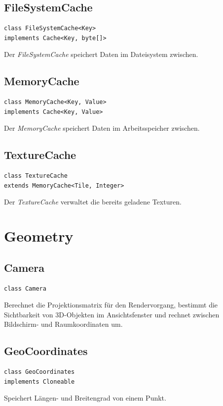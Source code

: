 \documentclass[10pt]{scrreprt}
\begin{document}
\vspace{5mm}
\subsection*{FileSystemCache}
\begin{lstlisting}
class FileSystemCache<Key>
implements Cache<Key, byte[]>
\end{lstlisting}
Der \textit{FileSystemCache} speichert Daten im Dateisystem zwischen.\\

\vspace{5mm}
\subsection*{MemoryCache}
\begin{lstlisting}
class MemoryCache<Key, Value>
implements Cache<Key, Value>
\end{lstlisting}
Der \textit{MemoryCache} speichert Daten im Arbeitsspeicher zwischen.\\

\vspace{5mm}
\subsection*{TextureCache}
\begin{lstlisting}
class TextureCache
extends MemoryCache<Tile, Integer>
\end{lstlisting}
Der \textit{TextureCache} verwaltet die bereits geladene Texturen.\\



\vspace{5mm}
\section{Geometry}
\subsection*{Camera}
\begin{lstlisting}
class Camera
\end{lstlisting}
Berechnet die Projektionsmatrix für den Rendervorgang, bestimmt die Sichtbarkeit von 3D-Objekten im Ansichtsfenster und rechnet zwischen Bildschirm- und Raumkoordinaten um.\\

\vspace{5mm}
\subsection*{GeoCoordinates}
\begin{lstlisting}
class GeoCoordinates
implements Cloneable
\end{lstlisting}
Speichert Längen- und Breitengrad von einem Punkt.\\
\end{document}
